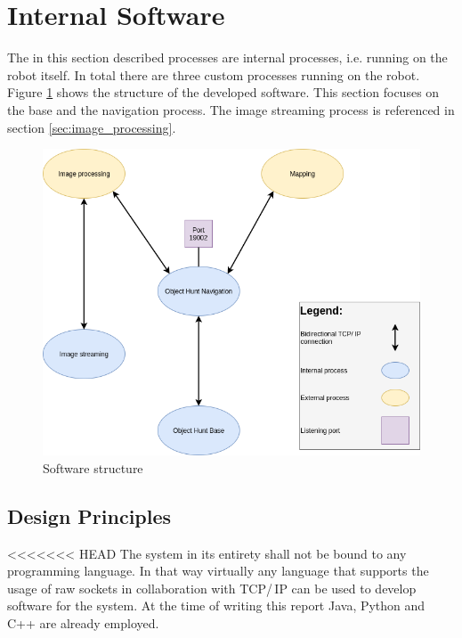 \newpage

\section{Internal Software}

The in this section described processes are internal processes, i.e. running on the robot itself. In total there are three custom processes running on the robot. Figure \ref{fig:software} shows the structure of the developed software. This section focuses on the base and the navigation process. The image streaming process is referenced in section \ref{sec:image_processing}.

\begin{figure}[H]
\centering
\includegraphics[scale=0.6]{sources/software_structure.png}
\caption[Software structure]{Software structure}
\label{fig:software}
\end{figure}

\subsection{Design Principles}

<<<<<<< HEAD
The system in its entirety shall not be bound to any programming language. In that way virtually any language that supports the usage of raw sockets in collaboration with TCP/\,IP can be used to develop software for the system. At the time of writing this report Java, Python and C++ are already employed.\\

